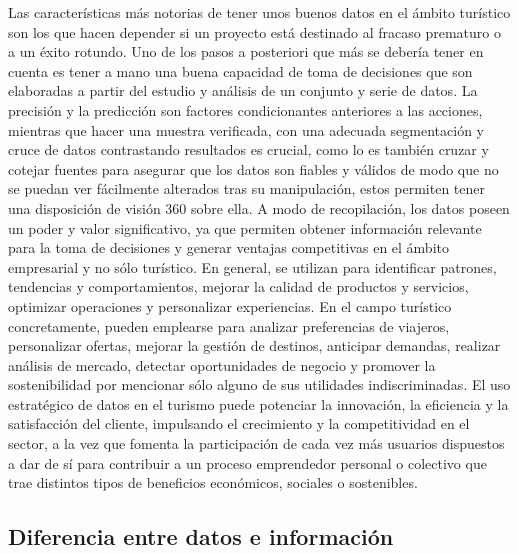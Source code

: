 \documentclass[
  letterpaper,
  DIV=11,
  numbers=noendperiod]{scrreprt}
\begin{document}
Las características más notorias de tener unos buenos datos en el ámbito
turístico son los que hacen depender si un proyecto está destinado al
fracaso prematuro o a un éxito rotundo. Uno de los pasos a posteriori
que más se debería tener en cuenta es tener a mano una buena capacidad
de toma de decisiones que son elaboradas a partir del estudio y análisis
de un conjunto y serie de datos. La precisión y la predicción son
factores condicionantes anteriores a las acciones, mientras que hacer
una muestra verificada, con una adecuada segmentación y cruce de datos
contrastando resultados es crucial, como lo es también cruzar y cotejar
fuentes para asegurar que los datos son fiables y válidos de modo que no
se puedan ver fácilmente alterados tras su manipulación, estos permiten
tener una disposición de visión 360 sobre ella. A modo de recopilación,
los datos poseen un poder y valor significativo, ya que permiten obtener
información relevante para la toma de decisiones y generar ventajas
competitivas en el ámbito empresarial y no sólo turístico. En general,
se utilizan para identificar patrones, tendencias y comportamientos,
mejorar la calidad de productos y servicios, optimizar operaciones y
personalizar experiencias. En el campo turístico concretamente, pueden
emplearse para analizar preferencias de viajeros, personalizar ofertas,
mejorar la gestión de destinos, anticipar demandas, realizar análisis de
mercado, detectar oportunidades de negocio y promover la sostenibilidad
por mencionar sólo alguno de sus utilidades indiscriminadas. El uso
estratégico de datos en el turismo puede potenciar la innovación, la
eficiencia y la satisfacción del cliente, impulsando el crecimiento y la
competitividad en el sector, a la vez que fomenta la participación de
cada vez más usuarios dispuestos a dar de sí para contribuir a un
proceso emprendedor personal o colectivo que trae distintos tipos de
beneficios económicos, sociales o sostenibles.

\hypertarget{diferencia-entre-datos-e-informaciuxf3n}{%
\subsection{Diferencia entre datos e
información}\label{diferencia-entre-datos-e-informaciuxf3n}}
\end{document}
